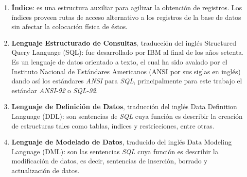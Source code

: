 \begin{enumerate}
	\item \textbf{Índice}: es una estructura auxiliar para agilizar la obtención de registros. Los índices proveen rutas de acceso alternativo a los registros de la base de datos sin afectar la colocación física de éstos\cite{FundamentalsOfDBSystems}.
	\item \textbf{Lenguaje Estructurado de Consultas}, traducción del inglés Structured Query Language (SQL): fue desarrollado por IBM\textsuperscript{\textcopyright} al final de los años setenta. Es un lenguaje de datos orientado a texto, el cual ha sido avalado por el Instituto Nacional de Estándares Americanos (ANSI por sus siglas en inglés) dando así los estándares \textit{ANSI} para \textit{SQL}, principalmente para este trabajo el estándar \textit{ANSI-92} o \textit{SQL-92}.
	\item \textbf{Lenguaje de Definición de Datos}, traducción del inglés Data Definition Language (DDL): son sentencias de \textit{SQL} cuya función es describir la creación de estructuras tales como tablas, índices y restricciones, entre otras\cite{DataBaseConcepts}.
	\item \textbf{Lenguaje de Modelado de Datos}, traducido del inglés Data Modeling Language (DML): son las sentencias \textit{SQL} cuya función es describir la modificación de datos, es decir, sentencias de inserción, borrado y actualización de datos\cite{DataBaseConcepts}.  
\end{enumerate}

